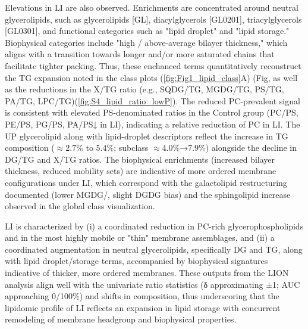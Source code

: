 \documentclass[10pt,letterpaper]{article}
\begin{document}
\begin{itemize}
Elevations in LI are also observed. Enrichments are concentrated around neutral glycerolipids, such as glycerolipids [GL], diacylglycerols [GL0201], triacylglycerols [GL0301], and functional categories such as "lipid droplet" and "lipid storage." Biophysical categories include "high / above-average bilayer thickness," which aligns with a transition towards longer and/or more saturated chains that facilitate tighter packing. Thus, these enchanced terms quantitatively reconstruct the TG expansion noted in the class plots (\ref{fig:Fig1_lipid_class}A) (Fig, as well as the reductions in the X/TG ratio (e.g., SQDG/TG, MGDG/TG, PS/TG, PA/TG, LPC/TG)(\ref{fig:S4_lipid_ratio_lowP}). The reduced PC-prevalent signal is consistent with elevated PS-denominated ratios in the Control group (PC/PS, PE/PS, PG/PS, PA/PS↓ in LI), indicating a relative reduction of PC in LI. The UP glycerolipid along with lipid-droplet descriptors reflect the increase in TG composition ($\approx$2.7\% to 5.4\%; subclass $\approx$4.0\%→7.9\%) alongside the decline in DG/TG and X/TG ratios. The biophysical enrichments (increased bilayer thickness, reduced mobility sets) are indicative of more ordered membrane configurations under LI, which correspond with the galactolipid restructuring documented (lower MGDG/, slight DGDG bias) and the sphingolipid increase observed in the global class visualization. 

LI is characterized by (i) a coordinated reduction in PC-rich glycerophospholipids and in the most highly mobile or "thin" membrane assemblages, and (ii) a coordinated augmentation in neutral glycerolipids, specifically DG and TG, along with lipid droplet/storage terms, accompanied by biophysical signatures indicative of thicker, more ordered membranes. These outputs from the LION analysis align well with the univariate ratio statistics (δ approximating ±1; AUC approaching 0/100\%) and shifts in composition, thus underscoring that the lipidomic profile of LI reflects an expansion in lipid storage with concurrent remodeling of membrane headgroup and biophysical properties.


\end{itemize}
\end{document}
